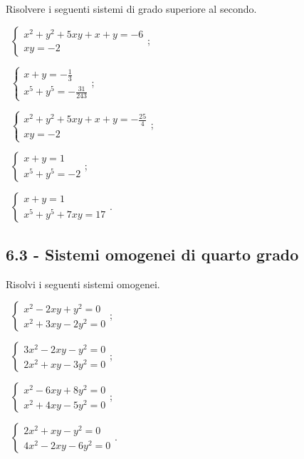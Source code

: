 \begin{esercizio}[\Ast]
\label{ese:6.35}
Risolvere i seguenti sistemi di grado superiore al secondo.
 \begin{enumeratea}
 \item~$\left\{\begin{array}{l}x^2+y^2+5xy+x+y=-6\\xy=-2 \end{array}\right.$;
 \item~$\left\{\begin{array}{l}{x+y=-\frac 1 3}\\{x^5+y^5=-\frac{31}{243}}\end{array}\right.$;
 \item~$\left\{\begin{array}{l}x^2+y^2+5xy+x+y=-\frac{25} 4\\xy=-2 \end{array}\right.$;
 \item~$\left\{\begin{array}{l}{x+y=1}\\{x^5+y^5=-2}\end{array}\right.$;
 \item~$\left\{\begin{array}{l}{x+y=1}\\{x^5+y^5+7{xy}=17}\end{array}\right.$.
 \end{enumeratea}
\end{esercizio}

\subsection*{6.3 - Sistemi omogenei di quarto grado}

\begin{esercizio}[\Ast]
 \label{ese:6.36}
Risolvi i seguenti sistemi omogenei.
\begin{multicols}{2}
 \begin{enumeratea}
 \item~$\left\{\begin{array}{l}x^2-2xy+y^2=0\\x^2+3xy-2y^2=0\end{array}\right.$;
 \item~$\left\{\begin{array}{l}3x^2-2xy-y^2=0\\2x^2+xy-3y^2=0\end{array}\right.$;
 \item~$\left\{\begin{array}{l}x^2-6{xy}+8y^2=0 \\x^2+4{xy}-5y^2=0 \end{array}\right.$;
 \item~$\left\{\begin{array}{l}2x^2+xy-y^2=0\\4x^2-2xy-6y^2=0\end{array}\right.$.
 \end{enumeratea}
\end{multicols}
\end{esercizio}

